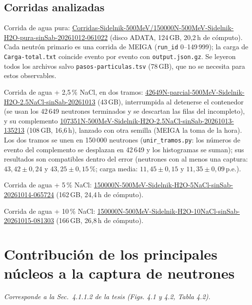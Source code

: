 \documentclass[11pt,a4paper]{article}
\begin{document}
\subsection{Corridas analizadas}
Corrida de agua pura: \url{Corridas-Sidelnik-500MeV/150000N-500MeV-Sidelnik-H2O-pura-sinSab-20261012-061022} (disco ADATA, 124\,GB, 20,2\,h de cómputo).
Cada neutrón primario es una corrida de MEIGA (\texttt{run\_id} 0--149\,999); la carga de \texttt{Carga-total.txt} coincide evento por evento con \texttt{output.json.gz}.
Se leyeron todos los archivos salvo \texttt{pasos-particulas.tsv} (78\,GB), que no se necesita para estos observables.
\par Corrida de agua + 2,5\,\% NaCl, en dos tramos: \url{42649N-parcial-500MeV-Sidelnik-H2O-2.5NaCl-sinSab-20261013} (43\,GB), interrumpida al detenerse el contenedor (se usan los 42\,649 neutrones terminados y se descartan las filas del incompleto),
y su complemento \url{107351N-500MeV-Sidelnik-H2O-2.5NaCl-sinSab-20261013-135213} (108\,GB, 16,6\,h), lanzado con otra semilla (MEIGA la toma de la hora). Los dos tramos se unen en 150\,000 neutrones (\texttt{unir\_tramos.py}: los números de evento del complemento se desplazan en 42\,649 y los histogramas se suman);
sus resultados son compatibles dentro del error (neutrones con al menos una captura: $43{,}42\pm0{,}24$ y $43{,}25\pm0{,}15$\,\%; carga media: $11{,}45\pm0{,}15$ y $11{,}35\pm0{,}09$\,p.e.).
\par Corrida de agua + 5\,\% NaCl: \url{150000N-500MeV-Sidelnik-H2O-5NaCl-sinSab-20261014-065724} (162\,GB, 24,4\,h de cómputo).
\par Corrida de agua + 10\,\% NaCl: \url{150000N-500MeV-Sidelnik-H2O-10NaCl-sinSab-20261015-081303} (166\,GB, 26,8\,h de cómputo).


\section{Contribución de los principales núcleos a la captura de neutrones}
{\small\textit{Corresponde a la Sec.~4.1.1.2 de la tesis (Figs. 4.1 y 4.2, Tabla 4.2).}}
\end{document}
